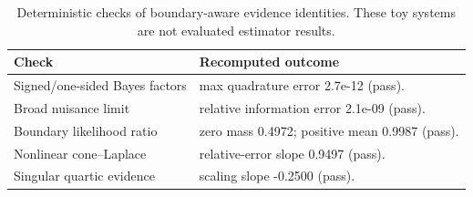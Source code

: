 \begin{table}[t]
\caption{Deterministic checks of boundary-aware evidence identities. These toy systems are not evaluated estimator results.}
\label{tab:supp-boundary-bayes-checks}
\centering
\scriptsize
\begin{tabularx}{\columnwidth}{@{}p{}X@{}}
\toprule
Check & Recomputed outcome \\
\midrule
Signed/one-sided Bayes factors & max quadrature error 2.7e-12 (pass). \\
Broad nuisance limit & relative information error 2.1e-09 (pass). \\
Boundary likelihood ratio & zero mass 0.4972; positive mean 0.9987 (pass). \\
Nonlinear cone--Laplace & relative-error slope 0.9497 (pass). \\
Singular quartic evidence & scaling slope -0.2500 (pass). \\
\bottomrule
\end{tabularx}
\end{table}
